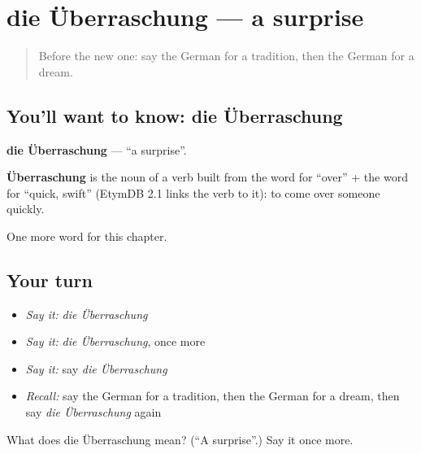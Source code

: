\section[die Überraschung]{die Überraschung — a surprise}

\label{lesson:GE-C240-ueberraschung}



\begin{quote}
Before the new one: say the German for a tradition, then the German for a dream.
\end{quote}

\subsection*{You'll want to know: die Überraschung}
\textbf{die Überraschung} — \textquotedblleft{}a surprise\textquotedblright{}.

\begin{cousinweb}
\textbf{Überraschung} is the noun of a verb built from the word for \textquotedblleft{}over\textquotedblright{} + the word for \textquotedblleft{}quick, swift\textquotedblright{} (EtymDB 2.1 links the verb to it): to come over someone quickly.
\end{cousinweb}

\begin{grammarlens}[title={What you've built}]
One more word for this chapter.
\end{grammarlens}

\subsection*{Your turn}
\begin{itemize}
\raggedright
  \item \emph{Say it:} \emph{die Überraschung}
  \item \emph{Say it:} \emph{die Überraschung}, once more
  \item \emph{Say it:} say \emph{die Überraschung}
  \item \emph{Recall:} say the German for a tradition, then the German for a dream, then say \emph{die Überraschung} again
\end{itemize}

\begin{tcolorbox}[breakable,colback=teal!4,colframe=teal!35!black,title={Before you move on}]
What does die Überraschung mean? (\textquotedblleft{}A surprise\textquotedblright{}.) Say it once more.
\end{tcolorbox}
